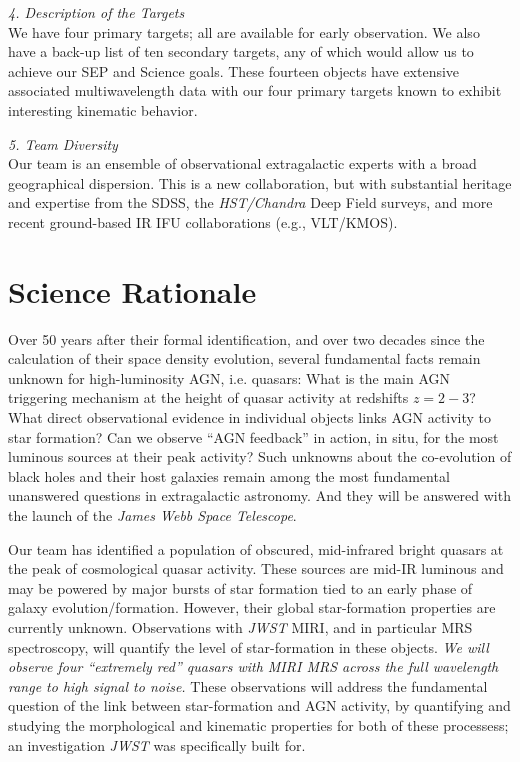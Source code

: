 \smallskip 
\smallskip \smallskip
\noindent
{\it 4. Description of the Targets}\\
We have four primary targets; all are available for early observation.
We also have a back-up list of ten secondary targets, any of which
would allow us to achieve our SEP and Science goals. These fourteen
objects have extensive associated multiwavelength data with our four
primary targets known to exhibit interesting kinematic behavior.

\smallskip 
\smallskip \smallskip
\noindent
{\it 5. Team Diversity}\\
Our team is an ensemble of observational extragalactic experts with a
broad geographical dispersion. This is a new collaboration, but with
substantial heritage and expertise from the SDSS, the {\it
HST/Chandra} Deep Field surveys, and more recent ground-based IR IFU
collaborations (e.g., VLT/KMOS).  

\section*{Science Rationale}
\vspace{-6pt}
\noindent
Over 50 years after their formal identification, and over two decades
since the calculation of their space density evolution, several
fundamental facts remain unknown for high-luminosity AGN,
i.e. quasars: What is the main AGN triggering mechanism at the height
of quasar activity at redshifts $z=2-3$? What direct observational
evidence in individual objects links AGN activity to star formation?
Can we observe ``AGN feedback'' in action, in situ, for the most
luminous sources at their peak activity?  Such unknowns about the
co-evolution of black holes and their host galaxies remain among the
most fundamental unanswered questions in extragalactic astronomy.  And
they will be answered with the launch of the {\it James Webb Space
Telescope}.

\smallskip \smallskip
\noindent
Our team has identified a population of obscured, mid-infrared bright
quasars at the peak of cosmological quasar activity.  These sources
are mid-IR luminous and may be powered by major bursts of star
formation tied to an early phase of galaxy
evolution/formation. However, their global star-formation properties
are currently unknown.  Observations with {\it JWST} MIRI, and in
particular MRS spectroscopy, will quantify the level of star-formation
in these objects.  {\it We will observe four ``extremely red'' quasars
with MIRI MRS across the full wavelength range to high signal to
noise.} These observations will address the fundamental question of
the link between star-formation and AGN activity, by quantifying and
studying the morphological and kinematic properties for both of these
processess; an investigation {\it JWST} was specifically built for.

